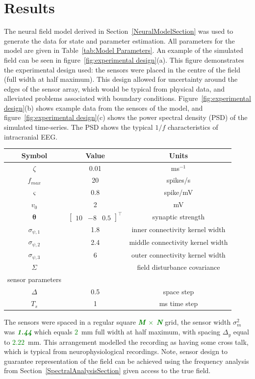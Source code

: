 \documentclass[12pt]{iopart}
\newcommand{\omg}[1]{\textsf{\emph{\textbf{\textcolor{green}{#1}}}}}
\begin{document}
\section{Results}\label{ResultsSection} The neural field model derived in Section~\ref{NeuralModelSection} was used to generate the data for state and parameter estimation. All parameters for the model are given in Table~\ref{tab:Model Parameters}. An example of the simulated field can be seen in figure~\ref{fig:experimental design}(a). This figure demonstrates the experimental design used: the sensors were placed in the centre of the field (full width at half maximum). This design allowed for uncertainty around the edges of the sensor array, which would be typical from physical data, and alleviated problems associated with boundary conditions. Figure~\ref{fig:experimental design}(b) shows example data from the sensors of the model, and figure~\ref{fig:experimental design}(c) shows the power spectral density (PSD) of the simulated time-series. The PSD shows the typical $1/f$ characteristics of intracranial EEG.
\begin{center}
\begin{tabular}{c|c|c}	
	\hline\hline Symbol & Value & Units \\
	\hline\hline
	$\zeta$ & 0.01 & ms$^{-1}$\\
	$f_{max}$ & 20 & spikes/s \\
	$\varsigma$ & 0.8 & spike/mV\\
	$v_0$ & 2 & mV\\
	$\boldsymbol{\theta}$ & $\left[\begin{array}{ccc}
	10 &-8 &0.5
	\end{array}
	\right]^{\top}$ & synaptic strength\\
	$\sigma_{\psi,1}$ & 1.8 & inner connectivity kernel width\\
	$\sigma_{\psi,2}$ & 2.4 & middle connectivity kernel width\\
	$\sigma_{\psi,3}$ & 6 & outer connectivity kernel width\\
	$\Sigma$ & & field disturbance covariance \\
	sensor parameters & & \\
	$\Delta$ & 0.5 & space step \\
	$T_s$ & 1 & ms time step \\ 
	\hline\hline
\end{tabular}\label{tab:Model Parameters}
\end{center}
The sensors were spaced in a regular square \omg{M $\times$ N} grid, the sensor width $\sigma^2_m$ was \omg{1.44} which equals \omg{$2$}~mm full width at half maximum, with spacing $\Delta_y$ equal to \omg{$2.22$}~mm. This arrangement modelled the recording as having some cross talk, which is typical from neurophysiological recordings. Note, sensor design to guarantee representation of the field can be achieved using the frequency analysis from Section~\ref{SpectralAnalysisSection} given access to the true field. 
\end{document}
